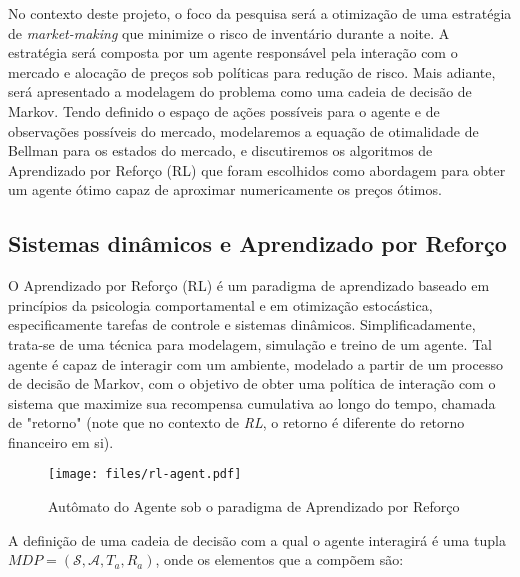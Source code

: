 No contexto deste projeto, o foco da pesquisa será a otimização de uma estratégia de \textit{market-making} que minimize o risco de inventário durante a noite. A estratégia será composta por um agente responsável pela interação com o mercado e alocação de preços sob políticas para redução de risco. Mais adiante, será apresentado a modelagem do problema como uma cadeia de decisão de Markov. Tendo definido o espaço de ações possíveis para o agente e de observações possíveis do mercado, modelaremos a equação de otimalidade de Bellman para os estados do mercado, e discutiremos os algoritmos de Aprendizado por Reforço (RL) que foram escolhidos como abordagem para obter um agente ótimo capaz de aproximar numericamente os preços ótimos.

\subsection{Sistemas dinâmicos e Aprendizado por Reforço}
O Aprendizado por Reforço (RL) é um paradigma de aprendizado baseado em princípios da psicologia comportamental e em otimização estocástica, especificamente tarefas de controle e sistemas dinâmicos. Simplificadamente, trata-se de uma técnica para modelagem, simulação e treino de um agente. Tal agente é capaz de interagir com um ambiente, modelado a partir de um processo de decisão de Markov, com o objetivo de obter uma política de interação com o sistema que maximize sua recompensa cumulativa ao longo do tempo, chamada de "retorno" (note que no contexto de \textit{RL}, o retorno é diferente do retorno financeiro em si).

\begin{figure}[H]
	\centering
	\texttt{[image: files/rl-agent.pdf]}
	\caption{Autômato do Agente sob o paradigma de Aprendizado por Reforço}
	\label{fig:rl-agent}
\end{figure}

A definição de uma cadeia de decisão com a qual o agente interagirá é uma tupla $MDP = (\mathcal{S}, \mathcal{A}, T_{a}, R_{a})$, onde os elementos que a compõem são:

